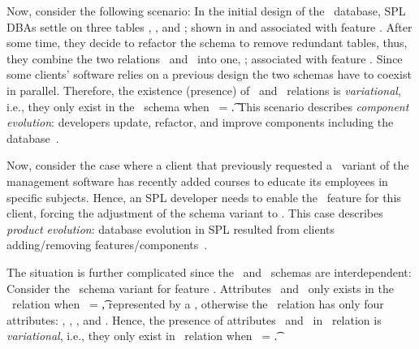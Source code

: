 Now, consider the following scenario:
In the initial design of the \basic\ database, SPL  DBAs
settle on three tables \engemp, \othemp, and \job; shown in  and associated
with feature \vOne. 
After some time, they decide
to refactor the schema to remove redundant tables,
thus, they combine the two
relations \engemp\ and \othemp\ into one, \empacct; associated with  feature \vTwo. 
Since some clients' 
software relies on a previous design the two schemas have to coexist in parallel.
Therefore, the existence (presence) of \engemp\ and \othemp\
relations is \emph{variational}, i.e., they only exist in the \basic\
schema when \vOne\ = \t.
This scenario describes \emph{component evolution}:
developers
update, refactor, and improve components including the database~\cite{dbSPLevolve}.

Now, consider the case where a client that previously requested a \basic\ variant of the
management software has recently added courses to educate its
employees in specific subjects. Hence, an SPL developer needs to enable
the \edu\ feature for this client, forcing the adjustment of the schema variant to \educational. 
This case describes \emph{product evolution}:
database evolution in SPL resulted
from clients adding/removing features/components~\cite{dbSPLevolve}. 

The situation is further complicated since the \basic\ and \educational\ schemas are interdependent:
Consider
the \basic\ schema 
variant for feature \vFour. Attributes \isstudent\ and \isteacher\ only exists
in the \empacct\ relation when \edu\ = \t, represented by a ,
otherwise the \empacct\
relation has only four attributes: \empno, \hiredate, \titleatt, and \deptno.
Hence, the presence of attributes \isstudent\ and \isteacher\ in \empacct\ relation is
\emph{variational}, i.e., they only exist in \empacct\ relation
when \edu\ = \t.

